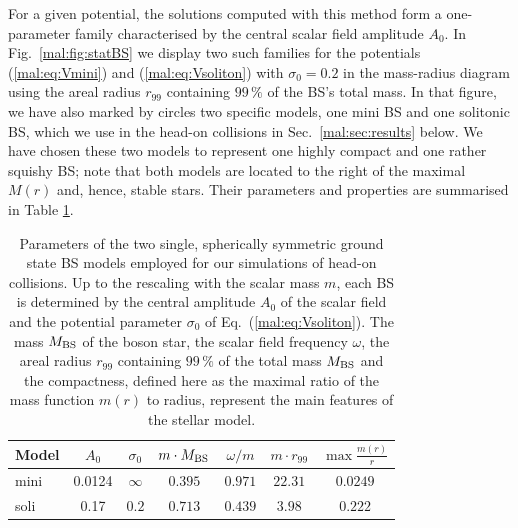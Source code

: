 For a given potential, the solutions computed with this method
form a one-parameter family characterised
by the central scalar field amplitude ${A}_0$. In
Fig.~\ref{mal:fig:statBS} we display two such families for the
potentials (\ref{mal:eq:Vmini}) and (\ref{mal:eq:Vsoliton}) with ${\sigma}_0=0.2$ in the
mass-radius diagram using the areal radius ${r}_{99}$ containing
$99\,\%$ of the BS's total mass. In that figure, we have also marked
by circles two specific models, one mini BS and one solitonic BS,
which we use in the head-on collisions in Sec.~\ref{mal:sec:results} below.
We have chosen these two models to represent one highly compact and
one rather squishy BS; note that both models are located
to the right of the maximal ${M}({r})$ and, hence, stable stars.
Their parameters and properties are summarised in Table
\ref{mal:tab:models}.
%
\begin{table}
    \centering
    \begin{tabular}{l|cccccc}
    \hline
    Model & $A_0$ & $\sigma_0$ & $m\cdot M_{\rm BS}$ & $\omega/m$ & $m \cdot r_{99}$ & $\max\frac{m(r)}{r}$  \\
    \hline
    mini & 0.0124 & $\infty$ & $0.395$ & $0.971$ & $22.31$ & $0.0249$ \\
    soli & 0.17 & $0.2$ & $0.713$ & $0.439$ & $3.98$ & $0.222$ \\
    \hline
    \end{tabular}
    \caption{Parameters of the two single, spherically symmetric
    ground state BS models employed for our simulations of
    head-on collisions. Up to the rescaling with the scalar mass
    $m$, each BS is determined by the central amplitude
    $A_0$ of the scalar field and the potential parameter
    $\sigma_0$ of Eq.~(\ref{mal:eq:Vsoliton}). The mass $M_{\rm BS}$ of the boson star,
    the scalar field frequency $\omega$, the areal radius $r_{99}$ containing
    $99\,\%$ of the total mass $M_{\rm BS}$ and the compactness, defined here
    as the maximal ratio of the mass function $m(r)$ to radius, represent
    the main features of the stellar model.}
    \label{mal:tab:models}
\end{table}
%







